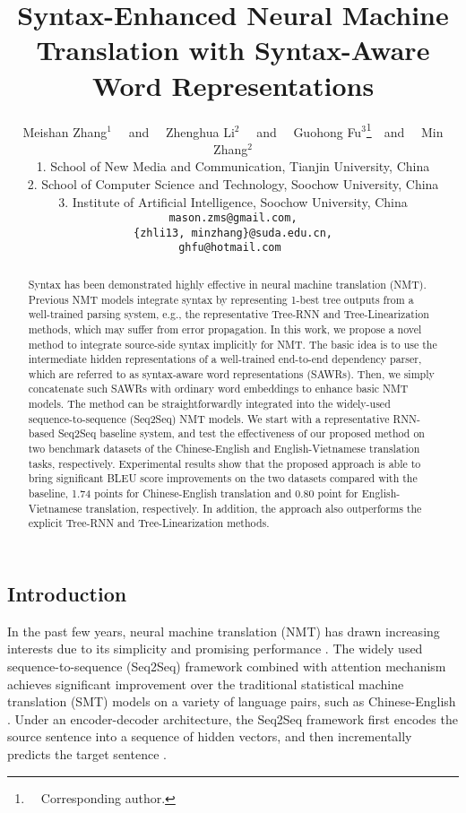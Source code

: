 \documentclass[11pt,a4paper]{article}
\title{Syntax-Enhanced Neural Machine Translation with Syntax-Aware Word Representations}
\author{Meishan Zhang$^1$ ~~\textnormal{and}~~ Zhenghua Li$^2$ ~~\textnormal{and}~~ Guohong Fu$^3$\thanks{~~Corresponding author.}~~\textnormal{and}~~ Min Zhang$^2$ \\
1. School of New Media and Communication, Tianjin University, China \\
2. School of Computer Science and Technology, Soochow University, China \\
3. Institute of Artificial Intelligence, Soochow University, China \\
{\tt mason.zms@gmail.com,} \\
{\tt \{zhli13, minzhang\}@suda.edu.cn,} \\
{\tt ghfu@hotmail.com }
}
\date{}
\begin{document}
\begin{CJK}{UTF8}{gbsn}

\maketitle
\begin{abstract}
Syntax has been demonstrated highly effective in neural machine translation (NMT).
Previous NMT models integrate syntax by representing 1-best tree outputs from a well-trained parsing system,
e.g., the representative Tree-RNN and Tree-Linearization methods, which may suffer from error propagation.
In this work, we propose a novel method to integrate source-side syntax implicitly for NMT.
The basic idea is to use the intermediate hidden representations of a well-trained end-to-end dependency parser,
which are referred to as syntax-aware word representations (SAWRs).
Then, we simply concatenate such SAWRs with ordinary word embeddings to enhance basic NMT models.
The method can be straightforwardly integrated into the widely-used sequence-to-sequence (Seq2Seq) NMT models.
We start with a representative RNN-based Seq2Seq baseline system,
and test the effectiveness of our proposed method on two benchmark datasets of the Chinese-English and English-Vietnamese translation tasks, respectively.
Experimental results show that the proposed approach is able to bring significant BLEU score improvements on the two datasets compared with the baseline,
1.74 points for Chinese-English translation and 0.80 point for English-Vietnamese translation, respectively.
In addition, the approach also outperforms the explicit Tree-RNN and Tree-Linearization methods.
\end{abstract}


\section{Introduction}

In the past few years, neural machine translation (NMT) has drawn increasing interests
due to its simplicity and promising performance \cite{bahdanau2014neural,jean2015montreal,stanfordmt2015,luong-pham-manning:2015:EMNLP,shen-EtAl:2016:P16-1,vaswani2017attention}.
The widely used
sequence-to-sequence (Seq2Seq) framework combined with attention mechanism achieves
significant improvement over the traditional statistical machine translation (SMT) models
on a variety of language pairs, such as Chinese-English \cite{shi-padhi-knight:2016:EMNLP2016,mi-EtAl:2016:EMNLP2016,vaswani2017attention,yongcheng:2018:ACLMain}.
Under an encoder-decoder architecture,
the Seq2Seq framework first encodes the source sentence  into a sequence of hidden vectors,
and then incrementally predicts the target sentence \cite{cho-EtAl:2014:SSST-8}.


\end{CJK}
\end{document}
